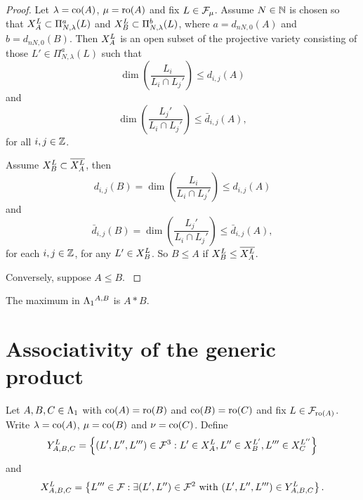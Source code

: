 \documentclass[a4paper, 11pt]{report}
\begin{document}
\begin{proof}
Let $\lambda=\co{A}$, $\mu=\ro{A}$ and fix $L\in\flags_\mu$. Assume $N\in\naturals$ is chosen so that $\xprod[L]{A}\subset\Pi_{N,\lambda}^a(L)$ and $\xprod[L]{B}\subset\Pi_{N,\lambda}^b(L)$, where $a=d_{nN,0}{(A)}$ and $b=d_{nN,0}{(B)}$. Then $\xprod[L]{A}$ is an open subset of the projective variety consisting of those $L'\in\Pi_{N,\lambda}^a(L)$ such that
\begin{equation*}
\dim\left(\frac{L_i}{L_i\cap L_j'}\right)\le d_{i,j}{(A)}
\end{equation*}
and
\begin{equation*}
\dim\left(\frac{L_j'}{L_i\cap L_j'}\right)\le\bar{d}_{i,j}{(A)},
\end{equation*}
for all $i,j\in\integers$.

Assume $\xprod[L]{B}\subset \overline{\xprod[L]{A}}$, then
\begin{equation*}
d_{i,j}{(B)} = \dim\left(\frac{L_i}{L_i\cap L_j'}\right) \le d_{i,j}{(A)}
\end{equation*}
and
\begin{equation*}
\bar{d}_{i,j}{(B)} = \dim\left(\frac{L_j'}{L_i\cap L_j'}\right) \le \bar{d}_{i,j}{(A)},
\end{equation*}
for each $i,j\in\integers$, for any $L'\in\xprod[L]{B}$. So $B\le A$ if $\xprod[L]{B}\le\overline{\xprod[L]{A}}$.

{\color{red}
Conversely, suppose $A\le B$.
}

\end{proof}

\begin{corollary}
The maximum in $\matrices^{A,B}$ is $A\ast B$.
\end{corollary}



\section{Associativity of the generic product}

Let $A,B,C\in\matrices$ with $\co{A}=\ro{B}$ and $\co{B}=\ro{C}$ and fix $L\in\flags_{\ro{A}}$. Write $\lambda=\co{A}$, $\mu=\co{B}$ and $\nu=\co{C}$. Define
\begin{equation*}
\yprod[L]{A,B,C} = \left\{(L',L'',L''')\in\flags^3: L'\in\xprod[L]{A}, L''\in\xprod[L']{B}, L'''\in\xprod[L'']{C}\right\}
\end{equation*}
and
\begin{equation*}
\xprod[L]{A,B,C} = \left\{L'''\in\flags: \exists (L',L'')\in\flags^2 \text{ with } (L',L'',L''')\in\yprod[L]{A,B,C}\right\}.
\end{equation*}
\end{document}
